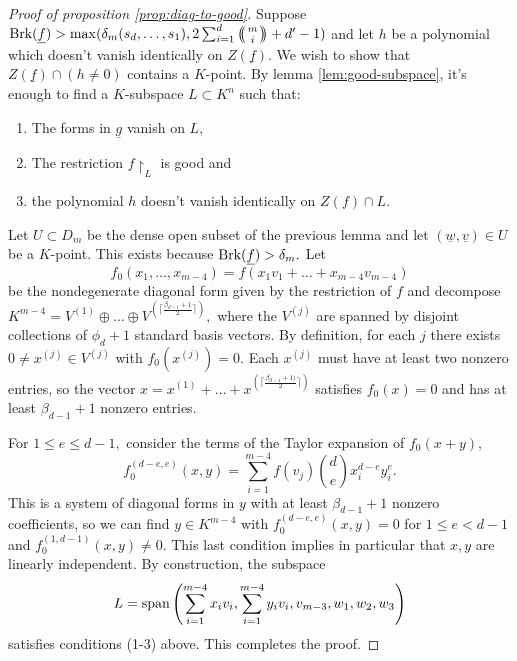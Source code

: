 \documentclass[12pt]{amsart}
\let\ul\underline
\theoremstyle{definition}
\def\multiset#1#2{\ensuremath{\left(\kern-.3em\left(\genfrac{}{}{0pt}{}{#1}{#2}\right)\kern-.3em\right)}}
\renewcommand{\sp}{\textnormal{span}}
\newcommand{\brk}{\textnormal{Brk}}
\let\ul\underline
\begin{document}
    \begin{proof}[Proof of proposition \ref{prop:diag-to-good}]

    Suppose $\brk(\ul{f}) > \max(\delta_m(s_d,\ldots,s_1), 2\sum_{i=1}^d\multiset{m}{i}+d'-1) $ and let $h$ be a polynomial which doesn't vanish identically on $Z(\ul{f}).$ We wish to show that $Z(\ul{f})\cap (h\neq 0)$ contains a $K$-point. By lemma \ref{lem:good-subspace}, it's enough to find a $K$-subspace $L\subset K^n$ such that: 
    \begin{enumerate}
        \item The forms in $\ul{g}$ vanish on $L,$
        \item The restriction $f\restriction_L$ is good and
        \item the polynomial $h$ doesn't vanish identically on $Z(f)\cap L.$
    \end{enumerate}
    
    Let $U\subset D_m$ be the dense open subset of the previous lemma and let  $(\ul{w},\ul{v})\in U$ be a $K$-point. This exists because $\brk(\ul{f}) > \delta_m.$ Let 
    $$ f_0(x_1,\ldots,x_{m-4}) = f(x_1v_1+\ldots+x_{m-4}v_{m-4})$$
    be the nondegenerate diagonal form given by the restriction of $f$ and decompose $K^{m-4} = V^{(1)}\oplus\ldots\oplus V^{(\lceil\frac{\beta_{d-1}+1}{2}\rceil)},$ where the $V^{(j)}$ are spanned by disjoint collections of $\phi_d+1$ standard basis vectors. By definition, for each $j$ there exists $0\neq x^{(j)}\in V^{(j)}$ with $f_0(x^{(j)}) = 0.$ Each $x^{(j)}$ must have at least two nonzero entries, so the vector $x = x^{(1)}+\ldots+x^{\left( \lceil\frac{\beta_{d-1}+1)}{2}\rceil \right)}$ satisfies $f_0(x) = 0$ and has at least $\beta_{d-1}+1$ nonzero entries.

    For $1\le e \le d-1,$ consider the terms of the Taylor expansion of $f_0(x+y),$
        \[
        f_0^{(d-e,e)}(x,y) =   \sum_{i=1}^{m-4} f(v_j) \binom{d}{e}  x_i^{d-e} y_i^e.
        \]
    This is a system of diagonal forms in $y$ with at least $\beta_{d-1}+1$ nonzero coefficients, so we can find $y\in K^{m-4}$ with $f_0^{(d-e,e)}(x,y)  = 0$ for $1\le e< d-1$ and $f_0^{(1,d-1)} (x,y) \neq 0.$ This last condition implies in particular that $x,y$ are linearly independent. By construction, the subspace
    \[
    L = \sp\left(\sum_{i=1}^{m-4} x_iv_i, \sum_{i=1}^{m-4} y_iv_i ,  v_{m-3}, w_1,w_2,w_3 \right) 
    \]
    satisfies conditions (1-3) above. This completes the proof.
\end{proof}




\end{document}
